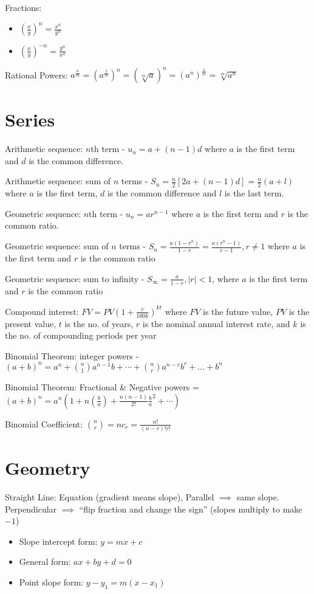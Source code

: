 \documentclass[10pt,a4paper,oneside]{book}
\begin{document}
Fractions:
\begin{itemize}
    \item $\left(\frac{x}{y}\right)^n = \frac{x^n}{y^n}$
    \item $\left(\frac{x}{y}\right)^{-n}=\frac{y^n}{x^n}$
\end{itemize}

Rational Powers: $a^{\frac{n}{m}} = (a^{\frac{1}{m}})^n = (\sqrt[m]{a})^n = (a^n)^{\frac{1}{m}}=\sqrt[m]{a^n}$

\section*{Series}

Arithmetic sequence: $n$th term - $u_n = a+(n-1)d$ where $a$ is the first term and $d$ is the common difference.

Arithmetic sequence: sum of $n$ terms - $S_n=\frac{n}{2}[2a+(n-1)d]=\frac{n}{2}(a+l)$ where $a$ is the first term, $d$ is the common difference and $l$ is the last term.

Geometric sequence: $n$th term - $u_n=ar^{n-1}$ where $a$ is the first term and $r$ is the common ratio.

Geometric sequence: sum of $n$ terms - $S_n=\frac{a(1-r^n)}{1-r}=\frac{a(r^n-1)}{r-1},r\neq 1$ where $a$ is the first term and $r$ is the common ratio 

Geometric sequence: sum to infinity - $S_{\infty}=\frac{a}{1-r}, |r|<1$, where $a$ is the first term and $r$ is the common ratio 

Compound interest: $FV=PV\left(1+\frac{r}{100k}\right)^{kt}$ where $FV$ is the future value, $PV$ is the present value, $t$ is the no. of years, $r$ is the nominal annual interest rate, and $k$ is the no. of compounding periods per year 

Binomial Theorem: integer powers - $(a+b)^n=a^n+\binom{n}{1}a^{n-1}b+\cdots+\binom{n}{r}a^{n-r}b^r+\dots+b^n$

Binomial Theorem: Fractional \& Negative powers = $(a+b)^n=a^n\left(1+n(\frac{b}{a})+\frac{n(n-1)}{2!}\frac{b}{a}^2+\cdots\right)$

Binomial Coefficient: $\binom{n}{r}=nc_r=\frac{n!}{(n-r)!r!}$

\section*{Geometry}
Straight Line: Equation (gradient means slope), Parallel $\implies$ same slope. Perpendicular $\implies$ ``flip fraction and change the sign'' (slopes multiply to make $-1$)
\begin{itemize}
    \item Slope intercept form: $y=mx+c$
    \item General form: $ax+by+d=0$
    \item Point slope form: $y-y_1=m(x-x_1)$
\end{itemize}
\end{document}
